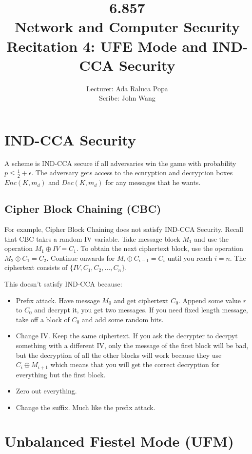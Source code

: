\documentclass[psamsfonts]{amsart}
\title{6.857 \\
Network and Computer Security \\
Recitation 4: UFE Mode and IND-CCA Security}
\author{Lecturer: Ada Raluca Popa\\
Scribe: John Wang}
\begin{document}
\maketitle

\section{IND-CCA Security}

A scheme is IND-CCA secure if all adversaries win the game with probability $p \leq \frac{1}{2} + \epsilon$. The adversary gets access to the ecnryption and decryption boxes $Enc(K, m_d)$ and $Dec(K, m_d)$ for any messages that he wants.

\subsection{Cipher Block Chaining (CBC)}

For example, Cipher Block Chaining does not satisfy IND-CCA Security. Recall that CBC takes a random IV variable. Take message block $M_1$ and use the operation $M_1 \oplus IV = C_1$. To obtain the next ciphertext block, use the operation $M_2 \oplus C_1 = C_2$. Continue onwards for $M_{i} \oplus C_{i-1} = C_{i}$ until you reach $i = n$. The ciphertext consists of $\{IV, C_1, C_2, \ldots, C_n\}$.

This doesn't satisfy IND-CCA because:
\begin{itemize}
  \item Prefix attack. Have message $M_0$ and get ciphertext $C_0$. Append some value $r$ to $C_0$ and decrypt it, you get two messages. If you need fixed length message, take off a block of $C_0$ and add some random bits.
  \item Change IV. Keep the same ciphertext. If you ask the decrypter to decrpyt something with a different IV, only the message of the first block will be bad, but the decryption of all the other blocks will work because they use $C_i \oplus M_{i+1}$ which means that you will get the correct decryption for everything but the first block.
  \item Zero out everything.
  \item Change the suffix. Much like the prefix attack.
\end{itemize}

\section{Unbalanced Fiestel Mode (UFM)}
\end{document}
